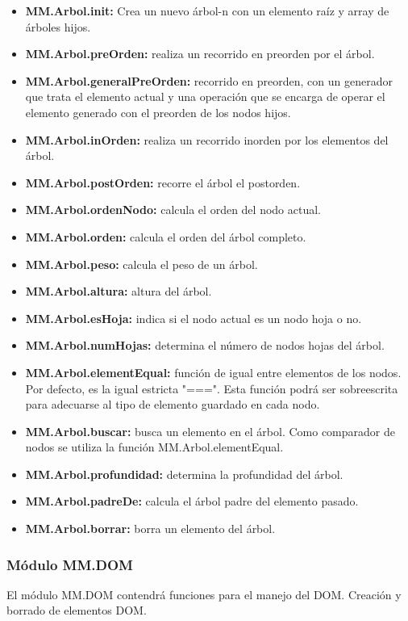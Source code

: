 \begin{itemize}
\item \textbf{MM.Arbol.init:} Crea un nuevo árbol-n con un elemento raíz y array de árboles hijos.
\item \textbf{MM.Arbol.preOrden:} realiza un recorrido en preorden por el árbol.
\item \textbf{MM.Arbol.generalPreOrden:} recorrido en preorden, con un generador que trata el elemento actual y una operación que se encarga de operar el elemento generado con el preorden de los nodos hijos.
\item \textbf{MM.Arbol.inOrden:} realiza un recorrido inorden por los elementos del árbol.
\item \textbf{MM.Arbol.postOrden:} recorre el árbol el postorden.
\item \textbf{MM.Arbol.ordenNodo:} calcula el orden del nodo actual.
\item \textbf{MM.Arbol.orden:} calcula el orden del árbol completo.
\item \textbf{MM.Arbol.peso:} calcula el peso de un árbol.
\item \textbf{MM.Arbol.altura:} altura del árbol.
\item \textbf{MM.Arbol.esHoja:} indica si el nodo actual es un nodo hoja o no.
\item \textbf{MM.Arbol.numHojas:} determina el número de nodos hojas del árbol.
\item \textbf{MM.Arbol.elementEqual:} función de igual entre elementos de los nodos. Por defecto, es la igual estricta "===". Esta función podrá ser sobreescrita para adecuarse al tipo de elemento guardado en cada nodo.
\item \textbf{MM.Arbol.buscar:} busca un elemento en el árbol. Como comparador de nodos se utiliza la función MM.Arbol.elementEqual.
\item \textbf{MM.Arbol.profundidad:} determina la profundidad del árbol.
\item \textbf{MM.Arbol.padreDe:} calcula el árbol padre del elemento pasado.
\item \textbf{MM.Arbol.borrar:} borra un elemento del árbol.
\end{itemize}



\subsubsection{Módulo MM.DOM}

El módulo MM.DOM contendrá funciones para el manejo del DOM. Creación y borrado de elementos DOM. 


